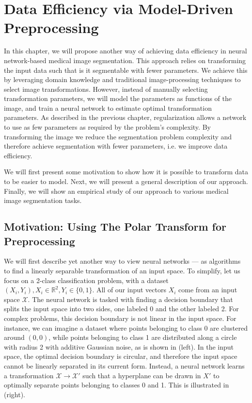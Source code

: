 
\chapter{Data Efficiency via Model-Driven Preprocessing}
\label{chap:model-driven-preprocessing}


In this chapter, we will propose another way of achieving data efficiency in neural network-based medical image segmentation. This approach relies on transforming the input data such that is it segmentable with fewer parameters. We achieve this by leveraging domain knowledge and traditional image-processing techniques to select image transformations. However, instead of manually selecting transformation parameters, we will model the parameters as functions of the image, and train a neural network to estimate optimal transformation parameters. As described in the previous chapter, regularization allows a network to use as few parameters as required by the problem's complexity. By transforming the image we reduce the segmentation problem complexity and therefore achieve segmentation with fewer parameters, i.e. we improve data efficiency.

 We will first present some motivation to show how it is possible to transform data to be easier to model. Next, we will present a general description of our approach. Finally, we will show an empirical study of our approach to various medical image segmentation tasks.

\section{Motivation: Using The Polar Transform for Preprocessing}

We will first describe yet another way to view neural networks --- as algorithms to find a linearly separable transformation of an input space. To simplify, let us focus on a 2-class classification problem, with a dataset ${(X_i, Y_i)}, X_i \in \mathbb{R}^2, Y_i \in \{0, 1\}$. All of our input vectors $X_i$ come from an input space $\mathcal{X}$. The neural network is tasked with finding a decision boundary that splits the input space into two sides, one labeled 0 and the other labeled 2. For complex problems, this decision boundary is not linear in the input space. For instance, we can imagine a dataset where points belonging to class 0 are clustered around $(0, 0)$, while points belonging to class 1 are distributed along a circle with radius 2 with additive Gaussian noise, as is shown in (left). In the input space, the optimal decision boundary is circular, and therefore the input space cannot be linearly separated in its current form. Instead, a neural network learns a transformation $\mathcal{X} \rightarrow \mathcal{X'}$ such that a hyperplane can be drawn in $X'$ to optimally separate points belonging to classes 0 and 1. This is illustrated in (right). 

